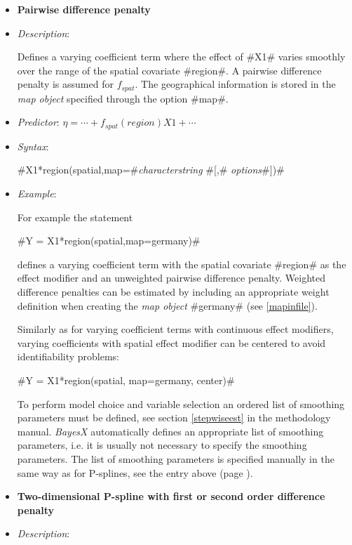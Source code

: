 \begin{itemize}
\item[]{\bf\sffamily Pairwise difference penalty}

\item[] {\em Description}:

Defines a varying coefficient term where the effect of #X1# varies
smoothly over the range of the spatial covariate #region#. A
pairwise difference penalty is assumed for $f_{spat}$. The geographical
information is stored in the {\em map object} specified through the
option #map#.
\item[] {\em Predictor}: $\eta = \cdots + f_{spat}(region)X1 + \cdots$
\item[] {\em Syntax}:

#X1*region(spatial,map=#{\it characterstring} #[,# {\it options}#])#
\item[] {\em Example}:

For example the statement

#Y = X1*region(spatial,map=germany)#

defines a varying coefficient term with the spatial covariate
#region# as the effect modifier and an unweighted pairwise difference penalty.
Weighted difference penalties  can be estimated by
including an appropriate weight definition when creating the {\em
map object} #germany# (see \autoref{mapinfile}).

Similarly as for varying coefficient terms with continuous effect
modifiers, varying coefficients with spatial effect modifier can be
centered to avoid identifiability problems:

#Y = X1*region(spatial, map=germany, center)#


To perform model choice and variable selection an ordered list of smoothing parameters must be defined, see
section \autoref{stepwiseest} in the methodology manual. {\em BayesX} automatically defines an appropriate
list of smoothing parameters, i.e. it
is usually not necessary to  specify the smoothing parameters.
The list of smoothing parameters is specified manually in the same way as for P-splines,
see the entry above (page \pageref{psplines_stepwise}).

\clearpage

\item[]{\bf\sffamily Two-dimensional P-spline with first or second order difference penalty}

\item[] {\em Description}:


\end{itemize}
